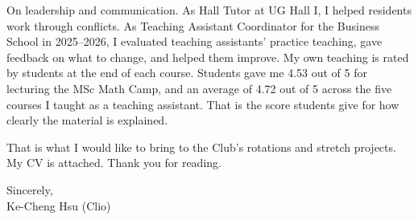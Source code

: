 \documentclass[11pt,letterpaper]{article}
\begin{document}
On leadership and communication. As Hall Tutor at UG Hall I, I helped residents work through conflicts. As Teaching Assistant Coordinator for the Business School in 2025--2026, I evaluated teaching assistants' practice teaching, gave feedback on what to change, and helped them improve. My own teaching is rated by students at the end of each course. Students gave me 4.53 out of 5 for lecturing the MSc Math Camp, and an average of 4.72 out of 5 across the five courses I taught as a teaching assistant. That is the score students give for how clearly the material is explained.

That is what I would like to bring to the Club's rotations and stretch projects. My CV is attached. Thank you for reading.

\vspace{0.7em}
Sincerely,\\[1.0em]
Ke-Cheng Hsu (Clio)
\end{document}
